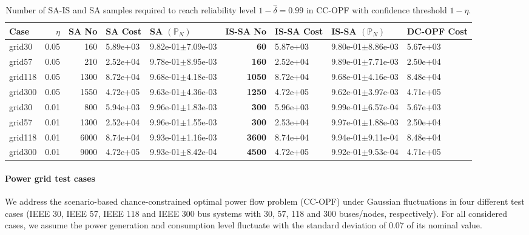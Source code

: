 \begin{landscape}
\begin{table}[t]
\caption{Number of SA-IS and SA samples required to reach reliability level $1-\hat{\delta} = 0.99$ in CC-OPF with confidence threshold $1-\eta$. }
    \centering
        \begin{tabular}{|lrrll|rll|l|}
        \toprule
           Case &  $\eta$ &  SA No &  SA Cost &   SA $(\mathbb{P}_N)$ &  IS-SA No & IS-SA Cost & IS-SA $(\mathbb{P}_N)$ & DC-OPF Cost \\
        \midrule
         grid30 &    0.05 &    160 & 5.89e+03 & 9.82e-01$\pm$7.09e-03 &        \textbf{60} &   5.87e+03 &  9.80e-01$\pm$8.86e-03 &    5.67e+03 \\
         grid57 &    0.05 &    210 & 2.52e+04 & 9.78e-01$\pm$8.95e-03 &       \textbf{160} &   2.52e+04 &  9.89e-01$\pm$7.71e-03 &    2.50e+04 \\
        grid118 &    0.05 &   1300 & 8.72e+04 & 9.68e-01$\pm$4.18e-03 &      \textbf{1050} &   8.72e+04 &  9.68e-01$\pm$4.16e-03 &    8.48e+04 \\
        grid300 &    0.05 &   1550 & 4.72e+05 & 9.63e-01$\pm$4.36e-03 &      \textbf{1250} &   4.72e+05 &  9.62e-01$\pm$3.97e-03 &    4.71e+05 \\
        \midrule
         grid30 &    0.01 &    800 & 5.94e+03 & 9.96e-01$\pm$1.83e-03 &       \textbf{300} &   5.96e+03 &  9.99e-01$\pm$6.57e-04 &    5.67e+03 \\
         grid57 &    0.01 &   1300 & 2.52e+04 & 9.96e-01$\pm$1.55e-03 &       \textbf{300} &   2.53e+04 &  9.97e-01$\pm$1.88e-03 &    2.50e+04 \\
        grid118 &    0.01 &   6000 & 8.74e+04 & 9.93e-01$\pm$1.16e-03 &      \textbf{3600} &   8.74e+04 &  9.94e-01$\pm$9.11e-04 &    8.48e+04 \\
        grid300 &    0.01 &   9000 & 4.72e+05 & 9.93e-01$\pm$8.42e-04 &      \textbf{4500} &   4.72e+05 &  9.92e-01$\pm$9.53e-04 &    4.71e+05 \\
        \bottomrule
        \end{tabular}
    \label{tab:summary_results-dc}
\end{table}
\end{landscape}

\paragraph{Power grid test cases}
We address the scenario-based chance-constrained optimal power flow problem (CC-OPF) under Gaussian fluctuations in four different test cases (IEEE 30, IEEE 57, IEEE 118 and IEEE 300 bus systems with 30, 57, 118 and 300 buses/nodes, respectively). For all considered cases, we assume the power generation and consumption level fluctuate with the standard deviation of 0.07 of its nominal value. 

